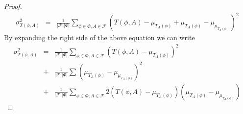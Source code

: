 \begin{proof}
\begin{eqnarray*}
\sigma^{2}_{T\left(\phi,A\right)} &=& \frac{1}{|\mathcal{F}||\Phi|}\displaystyle\sum_{\phi \in \Phi, A \in \mathcal{F}}(T\left(\phi,A\right) - \mu_{T_{A}(\phi)} + \mu_{T_{A}(\phi)} - \mu_{\mu_{T_{A}(\phi)}})^2
\end{eqnarray*}
By expanding the right side of the above equation we can write
\begin{eqnarray*}
\sigma^{2}_{T\left(\phi,A\right)} &=& \frac{1}{|\mathcal{F}||\Phi|}\displaystyle\sum_{\phi \in \Phi, A \in \mathcal{F}}(T\left(\phi,A\right) - \mu_{T_{A}(\phi)})^2\\
&+& \frac{1}{|\mathcal{F}||\Phi|}\displaystyle\sum_{}(\mu_{T_{A}(\phi)} - \mu_{\mu_{T_{A}(\phi)}})^2 \\
&+& \frac{1}{|\mathcal{F}||\Phi|}\displaystyle\sum_{\phi \in \Phi, A \in \mathcal{F}}2(T\left(\phi,A\right) - \mu_{T_{A}(\phi)})(\mu_{T_{A}(\phi)} - \mu_{\mu_{T_{A}(\phi)}}) \label{eqn:variance_T_A_phi}
\end{eqnarray*}


\end{proof}
